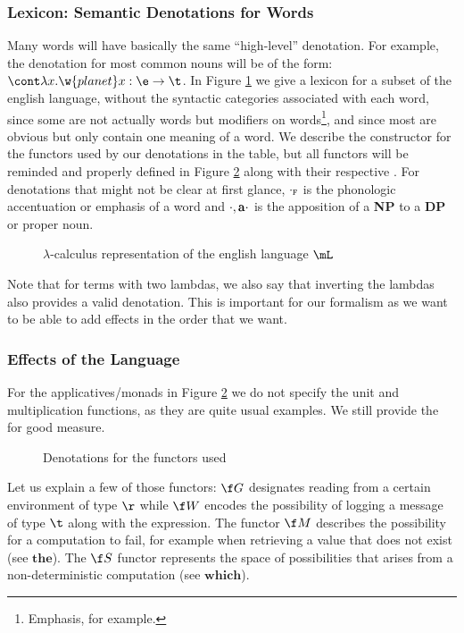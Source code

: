 \subsubsection{Lexicon: Semantic Denotations for Words}\label{subsec:lexicon}
Many words will have basically the same ``high-level'' denotation.
For example, the denotation for most common nouns will be of the form:
$\cont \lambda x. \w{planet} x: \e \to \t$.
In Figure \ref{fig:lexicon} we give a lexicon for a subset of the english
language, without the syntactic categories associated with each word, since
some are not actually words but modifiers on words\footnote{Emphasis,
	for example.}, and since most are obvious but only contain one meaning of a
word.
We describe the constructor for the functors used by our denotations in the
table, but all functors will be reminded and properly defined in Figure
\ref{fig:functors} along with their respective \fmap.
For denotations that might not be clear at first glance, $\cdot_{\tt F}$ is the
phonologic accentuation or emphasis of a word and ${\cdot, \bf a \cdot}$ is the
apposition of a \textbf{NP} to a \textbf{DP} or proper noun.
\begin{figure*}
	\centering
	
	\caption{$\lambda$-calculus representation of the english language $\mL$}
	\label{fig:lexicon}
\end{figure*}
Note that for terms with two lambdas, we also say that inverting the lambdas also provides a valid denotation.
This is important for our formalism as we want to be able to add effects in the order that we want.

\subsubsection{Effects of the Language}\label{subsec:effects}
For the applicatives/monads in Figure \ref{fig:functors} we do not specify the unit and multiplication functions, as they are quite usual examples.
We still provide the \fmap{} for good measure.

\begin{figure*}
	\centering
	
	\caption{Denotations for the functors used}
	\label{fig:functors}
\end{figure*}

Let us explain a few of those functors: $\f G$ designates reading from a certain environment of type $\r$ while $\f W$ encodes the possibility of logging a message of type $\t$ along with the expression.
The functor $\f M$ describes the possibility for a computation to fail, for example when retrieving a value that does not exist (see $\mathbf{the}$).
The $\f S$ functor represents the space of possibilities that arises from a non-deterministic computation (see $\mathbf{which}$).

